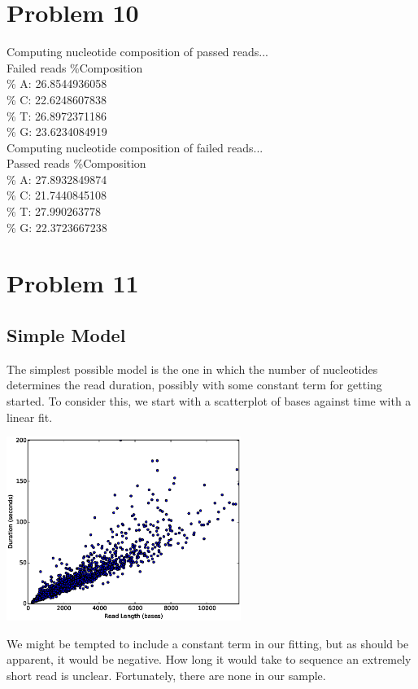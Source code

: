 \documentclass[11pt]{article}
\begin{document}
\section*{Problem 10}
Computing nucleotide composition of passed reads...\\
Failed reads \%Composition\\
\% A: 26.8544936058\\
\% C: 22.6248607838\\
\% T: 26.8972371186\\
\% G: 23.6234084919\\
Computing nucleotide composition of failed reads...\\
Passed reads \%Composition\\
\% A: 27.8932849874\\
\% C: 21.7440845108\\
\% T: 27.990263778\\
\% G: 22.3723667238\\
\section*{Problem 11}
\subsection*{Simple Model}

        The simplest possible model is the one in which the number of nucleotides determines the read duration,
        possibly with some constant term for getting started.  To consider this, we start with a scatterplot of
        bases against time with a linear fit.

        \includegraphics[width=3in]{part11scatterbd}

        We might be tempted to include a constant term in our fitting, but as should be apparent, it would be
        negative.  How long it would take to sequence an extremely short read is unclear.  Fortunately, there 
        are none in our sample.
        
\end{document}
